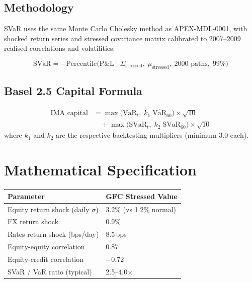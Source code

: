 \documentclass{apex_mdd}
\begin{document}
\subsection{Methodology}
SVaR uses the same Monte Carlo Cholesky method as APEX-MDL-0001, with shocked return series and stressed covariance matrix calibrated to 2007--2009 realised correlations and volatilities:
\begin{formulabox}
\[
  \mathrm{SVaR} = -\mathrm{Percentile}\bigl(\mathrm{P\&L}\mid \Sigma_{\mathrm{stressed}},\;\mu_{\mathrm{stressed}},\;2000\text{ paths},\;99\%\bigr)
\]
\end{formulabox}

\subsection{Basel 2.5 Capital Formula}
\begin{formulabox}
\begin{align*}
  \mathrm{IMA\_capital} &= \max\!\bigl(\mathrm{VaR}_t,\;k_1\;\overline{\mathrm{VaR}}_{60}\bigr)\times\sqrt{10}\\
                        &\quad + \max\!\bigl(\mathrm{SVaR}_t,\;k_2\;\overline{\mathrm{SVaR}}_{60}\bigr)\times\sqrt{10}
\end{align*}
where $k_1$ and $k_2$ are the respective backtesting multipliers (minimum 3.0 each).
\end{formulabox}

\section{Mathematical Specification}

\begin{center}
\small
\begin{tabular}{ll}
\toprule
\textbf{Parameter} & \textbf{GFC Stressed Value} \\
\midrule
Equity return shock (daily $\sigma$) & 3.2\% (vs 1.2\% normal) \\
FX return shock                      & 0.9\% \\
Rates return shock (bps/day)         & 8.5\,bps \\
Equity-equity correlation            & 0.87 \\
Equity-credit correlation            & $-0.72$ \\
SVaR / VaR ratio (typical)          & 2.5--4.0$\times$ \\
\bottomrule
\end{tabular}
\end{center}
\end{document}
